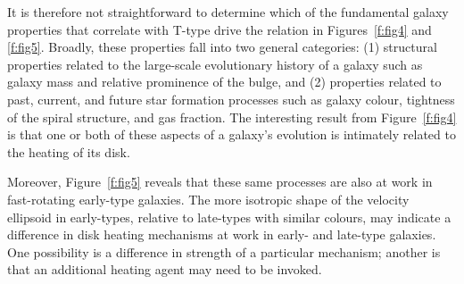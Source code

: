 \documentclass[useAMS,usenatbib]{mn2e}
\begin{document}
It is therefore not straightforward to determine which of the
fundamental galaxy properties that correlate with T-type drive the
relation in Figures~\ref{f:fig4} and \ref{f:fig5}.  Broadly, these
properties fall into two general categories: (1) structural properties
related to the large-scale evolutionary history of a galaxy such as
galaxy mass and relative prominence of the bulge, and (2) properties
related to past, current, and future star formation processes such as
galaxy colour, tightness of the spiral structure, and gas fraction.  The
interesting result from Figure~\ref{f:fig4} is that one or both of these
aspects of a galaxy's evolution is intimately related to the heating of
its disk.

Moreover, Figure~\ref{f:fig5} reveals that these same processes are also
at work in fast-rotating early-type galaxies.  The more isotropic shape
of the velocity ellipsoid in early-types, relative to late-types with
similar colours, may indicate a difference in disk heating mechanisms at
work in early- and late-type galaxies.  One possibility is a difference
in strength of a particular mechanism; another is that an additional
heating agent may need to be invoked.
\end{document}
